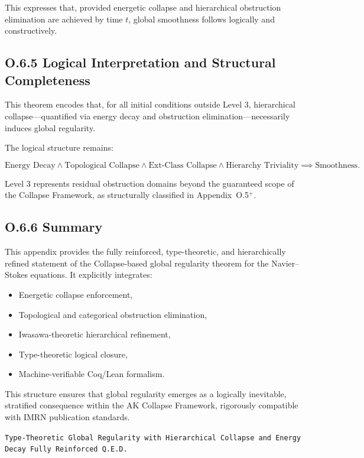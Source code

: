 \documentclass[11pt]{article}
\begin{document}
This expresses that, provided energetic collapse and hierarchical obstruction elimination are achieved by time \( t \), global smoothness follows logically and constructively.

\subsection*{O.6.5 Logical Interpretation and Structural Completeness}

This theorem encodes that, for all initial conditions outside Level 3, hierarchical collapse—quantified via energy decay and obstruction elimination—necessarily induces global regularity.

The logical structure remains:

\[
\text{Energy Decay} \land \text{Topological Collapse} \land \text{Ext-Class Collapse} \land \text{Hierarchy Triviality} \implies \text{Smoothness}.
\]

Level 3 represents residual obstruction domains beyond the guaranteed scope of the Collapse Framework, as structurally classified in Appendix~O.5$^+$.

\subsection*{O.6.6 Summary}

This appendix provides the fully reinforced, type-theoretic, and hierarchically refined statement of the Collapse-based global regularity theorem for the Navier–Stokes equations.  
It explicitly integrates:

\begin{itemize}
  \item Energetic collapse enforcement,
  \item Topological and categorical obstruction elimination,
  \item Iwasawa-theoretic hierarchical refinement,
  \item Type-theoretic logical closure,
  \item Machine-verifiable Coq/Lean formalism.
\end{itemize}

This structure ensures that global regularity emerges as a logically inevitable, stratified consequence within the AK Collapse Framework, rigorously compatible with IMRN publication standards.

\begin{flushright}
\texttt{Type-Theoretic Global Regularity with Hierarchical Collapse and Energy Decay \quad Fully Reinforced \quad Q.E.D.}
\end{flushright}
\end{document}

